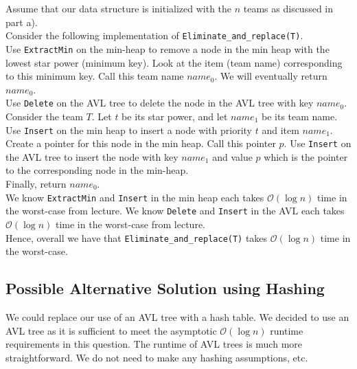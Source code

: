\documentclass[12pt]{article}
\begin{document}
Assume that our data structure is initialized with the $n$ teams as discussed in part a). \\

Consider the following implementation of \verb|Eliminate_and_replace(T)|. \\

Use \verb|ExtractMin| on the min-heap to remove a node in the min heap with the lowest star power (minimum key). Look at the item (team name) corresponding to this minimum key. Call this team name $name_0$. We will eventually return $name_0$. \\

Use \verb|Delete| on the AVL tree to delete the node in the AVL tree with key $name_0$. \\

Consider the team $T$. Let $t$ be its star power, and let $name_1$ be its team name. Use \verb|Insert| on the min heap to insert a node with priority $t$ and item $name_1$. Create a pointer for this node in the min heap. Call this pointer $p$. Use \verb|Insert| on the AVL tree to insert the node with key $name_1$ and value $p$ which is the pointer to the corresponding node in the min-heap. \\

Finally, return $name_0$. \\

We know \verb|ExtractMin| and \verb|Insert| in the min heap each takes $\mathcal{O}(\log n)$ time in the worst-case from lecture. We know \verb|Delete| and \verb|Insert| in the AVL each takes $\mathcal{O}(\log n)$ time in the worst-case from lecture. \\

Hence, overall we have that \verb|Eliminate_and_replace(T)| takes $\mathcal{O}(\log n)$ time in the worst-case. 

\subsection*{Possible Alternative Solution using Hashing}

We could replace our use of an AVL tree with a hash table. We decided to use an AVL tree as it is sufficient to meet the asymptotic $\mathcal{O}(\log n)$ runtime requirements in this question. The runtime of AVL trees is much more straightforward. We do not need to make any hashing assumptions, etc. \\
\end{document}
